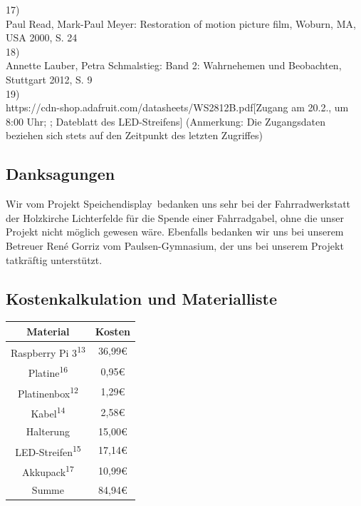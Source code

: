 \documentclass [a4paper, 11pt] {article}
\begin{document}
17)\\
Paul Read, Mark-Paul Meyer: \glqq Restoration of motion picture film\grqq, Woburn, MA, USA 2000, S. 24\\
18)\\
Annette Lauber, Petra Schmalstieg: \glqq Band 2: Wahrnehemen und Beobachten\grqq, Stuttgart 2012, S. 9\\
19) \\
https://cdn-shop.adafruit.com/datasheets/WS2812B.pdf[Zugang am 20.2., um 8:00 Uhr; ; Dateblatt des LED-Streifens]
(Anmerkung: Die Zugangsdaten beziehen sich stets auf den Zeitpunkt des letzten Zugriffes)

\subsection{Danksagungen}
Wir vom Projekt \glqq Speichendisplay\grqq\ bedanken uns sehr bei der Fahrradwerkstatt der Holzkirche Lichterfelde für die Spende einer Fahrradgabel, ohne die unser Projekt nicht möglich gewesen wäre. Ebenfalls bedanken wir uns bei unserem Betreuer René Gorriz vom Paulsen-Gymnasium, der uns bei unserem Projekt tatkräftig unterstützt.
\subsection{Kostenkalkulation und Materialliste}
\begin{table}[H]
	\begin{tabular}{|c|c|}
		\hline
		 Material & Kosten\\  
		\hline
		Raspberry Pi 3\textsuperscript{13} & 36,99\euro \\
		Platine\textsuperscript{16} & 0,95\euro \\
		Platinenbox\textsuperscript{12} & 1,29\euro \\
		Kabel\textsuperscript{14} & 2,58\euro \\
		Halterung & 15,00\euro \\
		LED-Streifen\textsuperscript{15} & 17,14\euro \\
		Akkupack\textsuperscript{17}	& 10,99\euro \\
		\hline
		Summe & 84,94\euro\\
		\hline
	\end{tabular}
	\label{Material}
\end{table}
\end{document}
